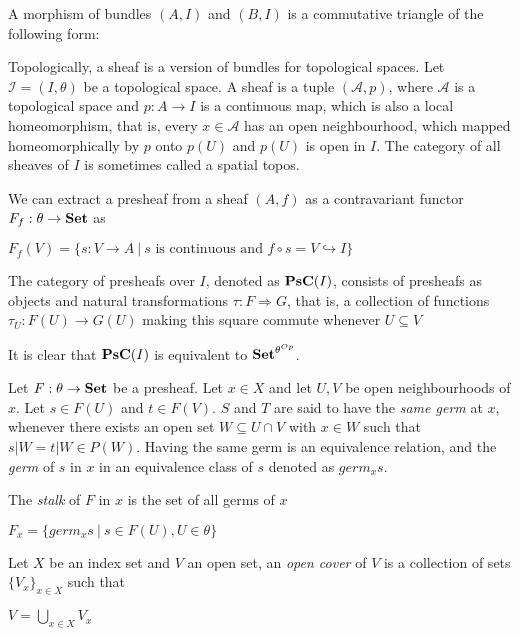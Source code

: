 \documentclass[a4paper]{article}
\theoremstyle{defin}
\theoremstyle{theorem}
\theoremstyle{claim}
\theoremstyle{prop}
\theoremstyle{lemma}
\theoremstyle{fact}
\theoremstyle{ex}
\theoremstyle{col}
\begin{document}
A morphism of bundles $(A, I)$ and $(B, I)$ is a commutative triangle of the following form:


Topologically, a sheaf is a version of bundles for topological spaces. Let $\mathcal{I} = (I, \theta)$ be a topological space. A sheaf is a tuple $(\mathcal{A}, p)$, where $\mathcal{A}$ is a topological space and $p : A \to I$ is a continuous map, which is also a local homeomorphism, that is, every $x \in \mathcal{A}$ has an open neighbourhood, which mapped homeomorphically by $p$ onto $p(U)$ and $p(U)$ is open in $I$. The category of all sheaves of $I$ is sometimes called a spatial topos.

We can extract a presheaf from a sheaf $(A, f)$ as a contravariant functor $F_f : \theta \to {\bf Set}$ as
\begin{center}
$F_f(V) = \{ s : V \to A \: | \: \text{$s$ is continuous and $f \circ s = V \hookrightarrow I $}\}$
\end{center}

The category of presheafs over $I$, denoted as ${\bf PsC}(I)$, consists of presheafs as objects and natural transformations $\tau : F \Rightarrow G$, that is, a collection of functions $\tau_U : F(U) \to G(U)$ making this square commute whenever $U \subseteq V$


It is clear that ${\bf PsC}(I)$ is equivalent to ${\bf Set}^{\theta^{Op}}$.

Let $F : \theta \to {\bf Set}$ be a presheaf. Let $x \in X$ and let $U, V$ be open neighbourhoods of $x$.
Let $s \in F(U)$ and $t \in F(V)$. $S$ and $T$ are said to have the \emph{same germ} at $x$, whenever there exists an open set $W \subseteq U \cap V$ with $x \in W$ such that $s|W = t|W \in P(W)$. Having the same germ is an equivalence relation, and the \emph{germ} of $s$ in $x$ in an equivalence class of $s$ denoted as $germ_x s$.

The \emph{stalk} of $F$ in $x$ is the set of all germs of $x$
\begin{center}
$F_x = \{ germ_x s \: | \: s \in F(U), U \in \theta \}$
\end{center}

Let $X$ be an index set and $V$ an open set, an \emph{open cover} of $V$ is a collection of sets $\{ V_x\}_{x \in X}$ such that
\begin{center}
$V = \bigcup \limits_{x \in X} V_x$
\end{center}
\end{document}
